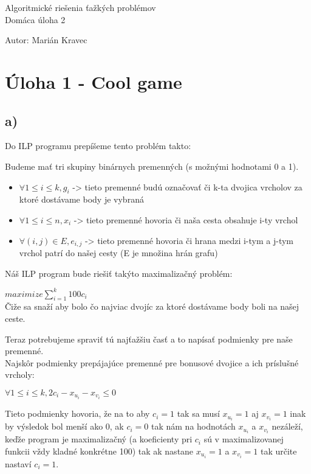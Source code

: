 \documentclass[a4paper]{article}
\begin{document}
 
	
\pagestyle{plain}

\begin{center}
	\sc\large
	Algoritmické riešenia ťažkých problémov\\
	Domáca úloha 2
\end{center}

Autor: Marián Kravec

\section{Úloha 1 - Cool game}

\subsection*{a)}

Do ILP programu prepíšeme tento problém takto:

Budeme mať tri skupiny binárnych premenných (s možnými hodnotami 0 a 1).
\begin{itemize}
	\item $\forall 1 \leq i \leq k, g_i$ -> tieto premenné budú označovať či k-ta dvojica vrcholov za ktoré dostávame body je vybraná
	\item $\forall 1 \leq i \leq n, x_i$ -> tieto premenné hovoria či naša cesta obsahuje i-ty vrchol
	\item $\forall (i, j) \in E, e_{i,j}$ -> tieto premenné hovoria či hrana medzi i-tym a j-tym vrchol patrí do našej cesty (E je množina hrán grafu)  
\end{itemize}

Náš ILP program bude riešiť takýto maximalizačný problém:

$maximize \sum_{i=1}^{k} 100 c_i$
\\

Čiže sa snaží aby bolo čo najviac dvojíc za ktoré dostávame body boli na našej ceste.
 
Teraz potrebujeme spraviť tú najťažšiu časť a to napísať podmienky pre naše premenné.
\\

Najskôr podmienky prepájajúce premenné pre bonusové dvojice a ich príslušné vrcholy:

$\forall 1 \leq i \leq k, 2 c_i - x_{u_i} - x_{v_i} \leq 0$

Tieto podmienky hovoria, že na to aby $c_i = 1$ tak sa musí $x_{u_i} = 1$ aj $x_{v_i} = 1$ inak by výsledok bol menší ako 0, ak $c_i = 0$ tak nám na hodnotách $x_{u_i}$ a $x_{v_i}$ nezáleží, keďže program je maximalizačný (a koeficienty pri $c_i$ sú v maximalizovanej funkcii vždy kladné konkrétne 100) tak ak nastane $x_{u_i} = 1$ a $x_{v_i} = 1$ tak určite nastaví $c_i = 1$.
\\
\end{document}
